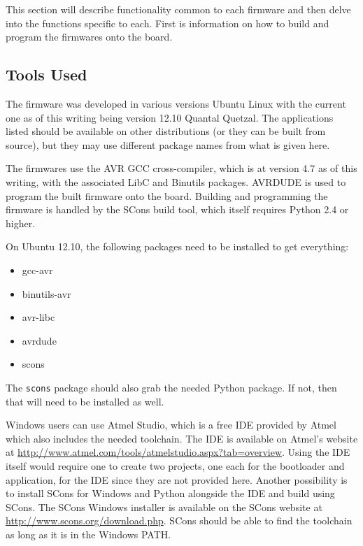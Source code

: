 \documentclass{article}
\begin{document}
This section will describe functionality common to each firmware and then delve into the functions
specific to each.  First is information on how to build and program the firmwares onto the board.

\subsection{Tools Used} \label{ssec:FWTools}
The firmware was developed in various versions Ubuntu Linux with the current one as of this writing
being version 12.10 Quantal Quetzal.  The applications listed should be available on other
distributions (or they can be built from source), but they may use different package names from what
is given here.

The firmwares use the AVR GCC cross-compiler, which is at version 4.7 as of this writing, with
the associated LibC and Binutils packages.  AVRDUDE is used to program the built firmware onto the
board.  Building and programming the firmware is handled by the SCons build tool, which itself
requires Python 2.4 or higher.

On Ubuntu 12.10, the following packages need to be installed to get everything:

\begin{itemize}
  \item gcc-avr
  \item binutils-avr
  \item avr-libc
  \item avrdude
  \item scons
\end{itemize}

The \texttt{scons} package should also grab the needed Python package.  If not, then that will need to be
installed as well.

Windows users can use Atmel Studio, which is a free IDE provided by Atmel which also includes the
needed toolchain.  The IDE is available on Atmel's website at
\url{http://www.atmel.com/tools/atmelstudio.aspx?tab=overview}.  Using the IDE itself would require
one to create two projects, one each for the bootloader and application, for the IDE since they are not
provided here.  Another possibility is to install SCons for Windows and Python alongside the IDE and
build using SCons.  The SCons Windows installer is available on the SCons website at
\url{http://www.scons.org/download.php}.  SCons should be able to find the toolchain as long as it
is in the Windows PATH.
\end{document}
